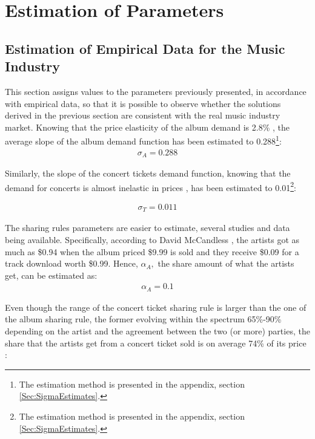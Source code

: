 \documentclass[letter,12pt]{article}
\numberwithin{equation}{section}
\begin{document}
\section{Estimation of Parameters} \label{Sec:Estimates}

\subsection{Estimation of Empirical Data for the Music Industry}

This section assigns values to the parameters previously presented,
in accordance with empirical data, so that it is possible to observe
whether the solutions derived in the previous section are consistent
with the real music industry market. Knowing that the price elasticity
of the album demand is 2.8\% \cite{gast2002}, the average slope of
the album demand function has been estimated to 0.288\footnote{
The estimation method is presented in the appendix, section \ref{Sec:SigmaEstimates}.
}:
\begin{eqnarray*}
\sigma_{A}=0.288
\end{eqnarray*}

Similarly, the slope of the concert tickets demand function, knowing
that the demand for concerts is almost inelastic in prices \cite{courty2009}, has been estimated to 0.01\footnote{
The estimation method is presented in the appendix, section \ref{Sec:SigmaEstimates}.
}:

\begin{eqnarray*}
\sigma_{T}=0.011
\end{eqnarray*}

The sharing rules parameters are easier to estimate, several studies
and data being available. Specifically, according to David McCandless \cite{mccandless2010}, the artists got as much as \$0.94 when the
album priced \$9.99 is sold and they receive \$0.09 for a track download
worth \$0.99. Hence, $\alpha_{A},$ the share amount of what the artists
get, can be estimated as:
\begin{eqnarray*}
\alpha_{A}=0.1
\end{eqnarray*}

Even though the range of the concert ticket sharing rule is larger
than the one of the album sharing rule, the former evolving within
the spectrum 65\%-90\% depending on the artist and the agreement between
the two (or more) parties, the share that the artists get from a concert
ticket sold is on average 74\% of its price \cite{michael2011}:
\end{document}
